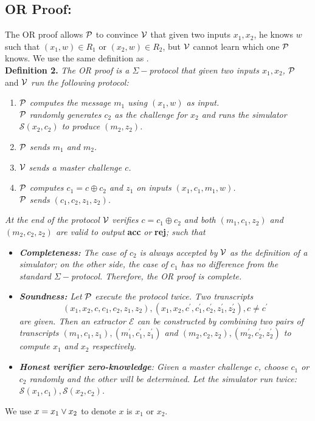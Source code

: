 \subsection{OR Proof:}The OR proof allows $\mathcal{P}$ to convince $\mathcal{V}$ that given two inputs $x_1,x_2$, he knows $w$ such that $(x_1,w)\in{R_1}$ or $(x_2,w)\in{R_2}$, but $\mathcal{V}$ cannot learn which one $\mathcal{P}$ knows. We use the same definition as \cite{damgard10}. \\
\textbf{Definition 2.} \textit{The OR proof is a $\Sigma-$protocol that given two inputs $x_1,x_2$,} $\mathcal{P}$ and $\mathcal{V}$ \textit{run the following protocol:}
\begin{enumerate}
    \item $\mathcal{P}$ \textit{computes the message $m_1$ using $(x_1,w)$ as input.} \\
    $\mathcal{P}$ \textit{randomly generates $c_2$ as the challenge for $x_2$ and runs the simulator $\mathcal{S}(x_2,c_2)$ to produce $(m_2,z_2)$.}
    \item $\mathcal{P}$ \textit{sends $m_1$ and $m_2$.}
    \item $\mathcal{V}$ \textit{sends a master challenge $c$.}
    \item $\mathcal{P}$ \textit{computes $c_1=c\oplus{c_2}$ and $z_1$ on inputs $(x_1,c_1,m_1,w)$.} \\
    $\mathcal{P}$ \textit{sends $(c_1,c_2,z_1,z_2)$.}
\end{enumerate}
\textit{At the end of the protocol} $\mathcal{V}$ \textit{verifies $c=c_1\oplus{c_2}$ and both $(m_1,c_1,z_2)$ and $(m_2,c_2,z_2)$ are valid to output} \textbf{acc} \textit{or} \textbf{rej}\textit{; such that}
\begin{itemize}
    \item \textit{\textbf{Completeness:} The case of $c_2$ is always accepted by} $\mathcal{V}$ \textit{as the definition of a simulator; on the other side, the case of $c_1$ has no difference from the standard $\Sigma-$protocol. Therefore, the OR proof is complete.}
    \item \textit{\textbf{Soundness:} Let} $\mathcal{P}$ \textit{execute the protocol twice. Two transcripts} 
    \[ (x_1,x_2,c,c_1,c_2,z_1,z_2),(x_1,x_2,c^\prime,c_1^\prime,c_2^\prime,z_1^\prime,z_2^\prime),c\ne{c^\prime} \] 
    \textit{are given. Then an extractor $\mathcal{E}$ can be constructed by combining two pairs of transcripts $(m_1,c_1,z_1),(m_1^\prime,c_1^\prime,z_1^\prime)$ and $(m_2,c_2,z_2),(m_2^\prime,c_2^\prime,z_2^\prime)$ to compute $x_1$ and $x_2$ respectively.}
    \item \textit{\textbf{Honest verifier zero-knowledge}: Given a master challenge $c$, choose $c_1$ or $c_2$ randomly and the other will be determined. Let the simulator run twice: $\mathcal{S}(x_1,c_1),\mathcal{S}(x_2,c_2)$. }
\end{itemize}
We use $x={x_1\lor{x_2}}$ to denote $x$ is $x_1$ or $x_2$.

